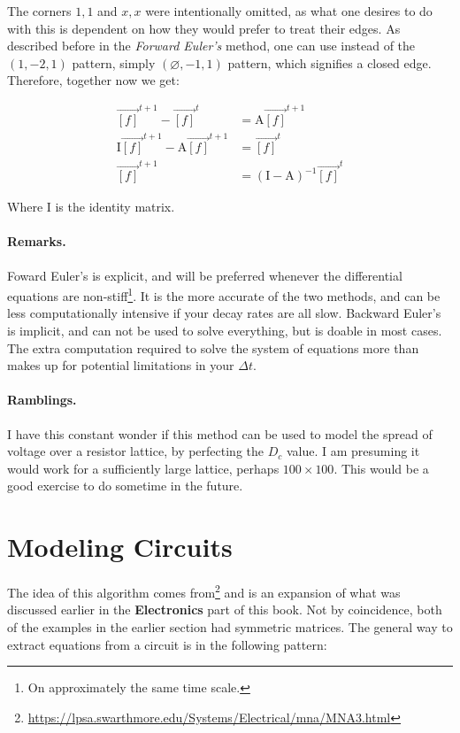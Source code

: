 \documentclass[12pt]{report}
\begin{document}
The corners $1,1$ and $x,x$ were intentionally omitted, as what one desires to do with this is dependent on how they would prefer to treat their edges. As described before in the \textit{Forward Euler's} method, one can use instead of the $(1,-2,1)$ pattern, simply $(\varnothing,-1,1)$ pattern, which signifies a closed edge. Therefore, together now we get: 

\begin{equation} \label{diff7}
\begin{split}
\vec{[f]}^{t+1} - \vec{[f]}^{t} & = \mathrm{A} \vec{[f]}^{t+1} \\
\mathrm{I}\vec{[f]}^{t+1} - \mathrm{A}\vec{[f]}^{t+1} & = \vec{[f]}^{t} \\
\vec{[f]}^{t+1} & = (\mathrm{I} - \mathrm{A})^{-1}\vec{[f]}^{t}
\end{split}
\end{equation}

Where I is the identity matrix. 

\subsubsection{Remarks.} 
Foward Euler's is explicit, and will be preferred whenever the differential equations are non-stiff\footnote{On approximately the same time scale.}. It is the more accurate of the two methods, and can be less computationally intensive if your decay rates are all slow. Backward Euler's is implicit, and can not be used to solve everything, but is doable in most cases. The extra computation required to solve the system of equations more than makes up for potential limitations in your $\Delta t$. 

\subsubsection{Ramblings.} 
I have this constant wonder if this method can be used to model the spread of voltage over a resistor lattice, by perfecting the $D_c$ value. I am presuming it would work for a sufficiently large lattice, perhaps $100 \times 100$. This would be a good exercise to do sometime in the future. 



\chapter{Modeling Circuits}
\label{Modeling Circuits}

The idea of this algorithm comes from\footnote{\url{https://lpsa.swarthmore.edu/Systems/Electrical/mna/MNA3.html}} and is an expansion of what was discussed earlier in the \textbf{Electronics} part of this book. Not by coincidence, both of the examples in the earlier section had symmetric matrices. The general way to extract equations from a circuit is in the following pattern:   
\end{document}
